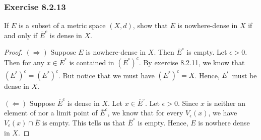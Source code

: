\subsubsection{Exercise 8.2.13} If \( E  \) is a subset of a metric space \( (X,d) \), show that \( E  \) is nowhere-dense in \( X  \) if and only if \( \overline{E}^{c}  \) is dense in \( X  \). 
\begin{proof}
    \( (\Rightarrow)  \) Suppose \( E  \) is nowhere-dense in \( X  \). Then \( \overline{E}^{\circ}  \) is empty. Let \( \epsilon > 0  \). Then for any \( x \in \overline{E}^{\circ}  \) is contained in \( (\overline{E}^{\circ})^{c} \). By exercise 8.2.11, we know that \( (\overline{E}^{\circ})^{c} = \overline{(\overline{E}^{\circ})^{c}}\). But notice that we must have \( \overline{ (\overline{E}^{\circ})^{c}}  = X   \). Hence, \( \overline{E}^{c} \)  must be dense in \( X  \).

    \( (\Leftarrow) \) Suppose \( \overline{E}^c \) is dense in \( X  \). Let \( x \in \overline{E}^{\circ} \). Let \( \epsilon > 0  \). Since \( x  \) is neither an element of nor a limit point of \( \overline{E}^c \), we know that for every \( V_{\epsilon }(x)   \), we have \( V_{\epsilon }(x) \cap \overline{E} \) is empty. This tells us that \( \overline{E}^{\circ}  \) is empty. Hence, \( E  \) is nowhere dense in \( X  \).
\end{proof}





